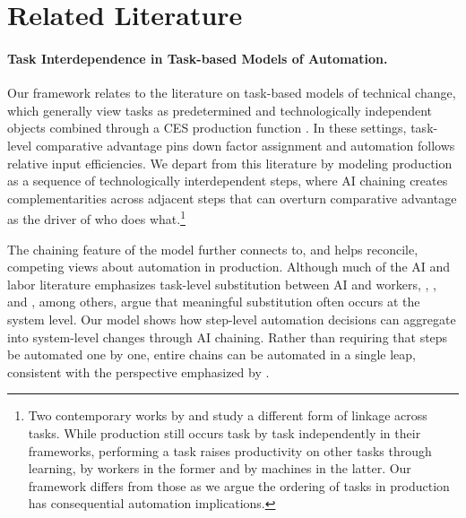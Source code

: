 \section{Related Literature}


\paragraph{Task Interdependence in Task-based Models of Automation.}
Our framework relates to the literature on task-based models of technical change, which generally view tasks as predetermined and technologically independent objects combined through a CES production function \citep{acemoglu2011skills, acemoglu2018, acemoglu2019automation, acemoglu2024tasks}.
In these settings, task-level comparative advantage pins down factor assignment and automation follows relative input efficiencies.
We depart from this literature by modeling production as a sequence of technologically interdependent steps, where AI chaining creates complementarities across adjacent steps that can overturn comparative advantage as the driver of who does what.\footnote{Two contemporary works by \cite{trammell2026workflows} and \cite{farboodi2026data} study a different form of linkage across tasks. While production still occurs task by task independently in their frameworks, performing a task raises productivity on other tasks through learning, by workers in the former and by machines in the latter.
Our framework differs from those as we argue the ordering of tasks in production has consequential automation implications.
}

The chaining feature of the model further connects to, and helps reconcile, competing views about automation in production.
Although much of the AI and labor literature emphasizes task-level substitution between AI and workers, \cite{autor2003skill}, \cite{acemoglu2019automation}, and \cite{bresnahan2002information}, among others, argue that meaningful substitution often occurs at the system level.
Our model shows how step-level automation decisions can aggregate into system-level changes through AI chaining.
Rather than requiring that steps be automated one by one, entire chains can be automated in a single leap, consistent with the perspective emphasized by \cite{bresnahan2002information}.


